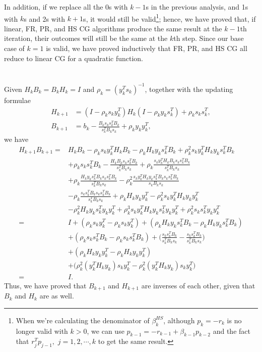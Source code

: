 \documentclass[11pt]{article}
\begin{document}
In addition, if we replace all the 0s with $k-1$s in the previous analysis, and 1s with $k$s and 2s with $k+1$s, it would still be valid\footnote{When we're calculating the denominator of $\beta^{HS}_k$, although $p_k=-r_k$ is no longer valid with $k>0$, we can use $p_{k-1} = -r_{k-1} + \beta_{k-1}p_{k-2}$ and the fact that $r_{j}^Tp_{j-1},\,\,j = 1, 2, \cdots, k$ to get the same result.}; hence, we have proved that, if linear, FR, PR, and HS CG algorithms produce the same result at the ${k-1}$th iteration, their outcomes will still be the same at the $k$th step. Since our base case of $k=1$ is valid, we have proved inductively that FR, PR, and HS CG all reduce to linear CG for a quadratic function. 

\section{}
Given $H_kB_k = B_kH_k=I$ and $\rho_k = (y_k^Ts_k)^{-1}$, together with the updating formulae
\begin{equation}\begin{split} 
H_{k+1} &= (I-\rho_k s_k y_k^T )H_k(I-\rho_ky_ks_k^T) + \rho_ks_ks_k^T,\\
B_{k+1} &=b_k - \frac{B_ks_ks_k^TB_k}{s_k^TB_ks_k} + \rho_ky_ky_k^T,
\end{split}\nonumber\end{equation} 
we have 
\begin{equation}\begin{split} 
H_{k+1}B_{k+1} =& H_kB_k -\rho_ks_ky_k^TH_kB_k - \rho_kH_ky_ks_k^TB_k + \rho_k^2s_ky_k^TH_ky_ks_k^TB_k \\
& +\rho_ks_ks_k^TB_k-\frac{H_kB_ks_ks_k^TB_k}{s_k^TB_ks_k} + \rho_k\frac{s_ky_k^TH_kB_ks_ks_k^TB_k}{s_k^TB_ks_k}\\
&+\rho_k\frac{H_ky_ks_k^TB_ks_ks_k^TB_k}{s_k^TB_ks_k} -\rho_k^2\frac{s_ky_k^TH_ky_ks_k^TB_ks_ks_k^TB_k}{s_kB_ks_k}\\
&-\rho_k\frac{s_ks_k^TB_ks_ks_k^TB_k}{s_k^TB_ks_k}+\rho_kH_ky_ky_k^T-\rho_k^2s_ky_k^TH_ky_ky_k^T \\
&- \rho_k^2H_ky_ks_k^Ty_ky_k^T + \rho_k^3s_ky_k^TH_ky_ks_k^Ty_ky_k^T + \rho_k^2s_ks_k^Ty_ky_k^T \\
=&I + (\rho_ks_ky_k^T - \rho_ks_ky_k^T) + (\rho_kH_ky_ks_k^TB_k-\rho_kH_ky_ks_k^TB_k) \\
& +(\rho_ks_ks_k^TB_k - \rho_ks_ks_k^TB_k) + \Big(\frac{s_ks_k^TB_k}{s_k^TB_ks_k}-\frac{s_ks_k^TB_k}{s_k^TB_ks_k} \Big) \\
& + (\rho_kH_ky_ky_k^T - \rho_kH_ky_ky_k^T) \\
& + \Big( \rho_k^2(y_k^TH_ky_k)s_ky_k^T - \rho_k^2(y_k^TH_ky_k)s_ky_k^T \Big) \\
=&I.
\end{split}\nonumber\end{equation} 
Thus, we have proved that $B_{k+1}$ and $H_{k+1}$ are inverses of each other, given that $B_k$ and $H_k$ are as well.
\end{document}
